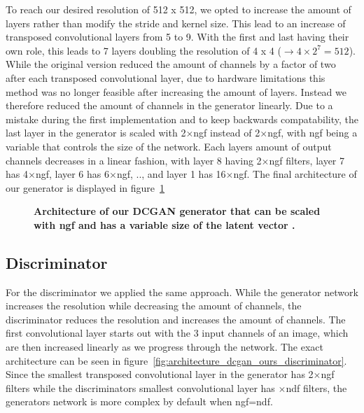             To reach our desired resolution of 512 x 512, we opted to increase the amount of layers rather than modify the stride and kernel size. This lead to an increase of transposed convolutional layers from 5 to 9. With the first and last having their own role, this leads to 7 layers doubling the resolution of 4 x 4 ($\rightarrow 4 \times 2^7 = 512$). While the original version reduced the amount of channels by a factor of two after each transposed convolutional layer, due to hardware limitations this method was no longer feasible after increasing the amount of layers. Instead we therefore reduced the amount of channels in the generator linearly. Due to a mistake during the first implementation and to keep backwards compatability, the last layer in the generator is scaled with 2$\times$ngf instead of 2$\times$ngf, with ngf being a variable that controls the size of the network. Each layers amount of output channels decreases in a linear fashion, with layer 8 having 2$\times$ngf filters, layer 7 has 4$\times$ngf, layer 6 has 6$\times$ngf, .., and layer 1 has 16$\times$ngf. The final architecture of our generator is displayed in figure~\ref{fig:architecture_dcgan_ours_generator}
        
            \begin{figure}[ht]
                \centering
                \caption[DCGAN generator architecture]
                {
                    \textbf{Architecture of our DCGAN generator that can be scaled with ngf and has a variable size of the latent vector .}
                }
                \label{fig:architecture_dcgan_ours_generator}
            \end{figure}

        \subsection{Discriminator}

            For the discriminator we applied the same approach. While the generator network increases the resolution while decreasing the amount of channels, the discriminator reduces the resolution and increases the amount of channels. The first convolutional layer starts out with the 3 input channels of an image, which are then increased linearly as we progress through the network. The exact architecture can be seen in figure~\ref{fig:architecture_dcgan_ours_discriminator}. Since the smallest transposed convolutional layer in the generator has 2$\times$ngf filters while the discriminators smallest convolutional layer has $\times$ndf filters, the generators network is more complex by default when ngf=ndf.

